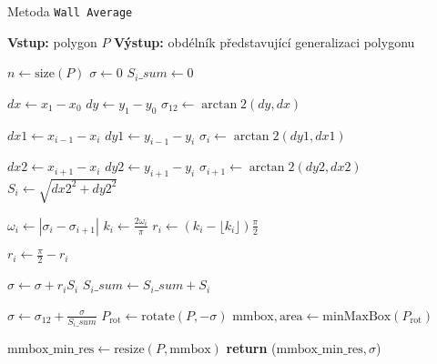 \begin{algorithm}
    \caption{Metoda \texttt{Wall Average}}
    \begin{algorithmic}[1]
        \STATE \textbf{Vstup:} polygon $P$
        \STATE \textbf{Výstup:} obdélník představující generalizaci polygonu
        
        \STATE $n \gets \text{size}(P)$
        \STATE $\sigma \gets 0$
        \STATE $S_i\_sum \gets 0$
        
        \STATE $dx \gets x_1 - x_0$
        \STATE $dy \gets y_1 - y_0$
        \STATE $\sigma_{12} \gets \arctan2(dy, dx)$
        
            \STATE $dx1 \gets x_{i-1} - x_i$
            \STATE $dy1 \gets y_{i-1} - y_i$
            \STATE $\sigma_i \gets \arctan2(dy1, dx1)$
            
            \STATE $dx2 \gets x_{i+1} - x_i$
            \STATE $dy2 \gets y_{i+1} - y_i$
            \STATE $\sigma_{i+1} \gets \arctan2(dy2, dx2)$
            \STATE $S_i \gets \sqrt{dx2^2 + dy2^2}$
            
            \STATE $\omega_i \gets |\sigma_i - \sigma_{i+1}|$
            \STATE $k_i \gets \frac{2 \omega_i}{\pi}$
            \STATE $r_i \gets (k_i - \lfloor k_i \rfloor) \frac{\pi}{2}$
            
                \STATE $r_i \gets \frac{\pi}{2} - r_i$
            \ENDIF
            
            \STATE $\sigma \gets \sigma + r_i S_i$
            \STATE $S_i\_sum \gets S_i\_sum + S_i$
        \ENDFOR
        
        \STATE $\sigma \gets \sigma_{12} + \frac{\sigma}{S_i\_sum}$
        \STATE $P_{\text{rot}} \gets \text{rotate}(P, -\sigma)$
        \STATE $\text{mmbox}, \text{area} \gets \text{minMaxBox}(P_{\text{rot}})$
        
        \STATE $\text{mmbox\_min\_res} \gets \text{resize}(P, \text{mmbox})$
        \STATE \textbf{return} ($\text{mmbox\_min\_res}, \sigma$)
    \end{algorithmic}
\end{algorithm}